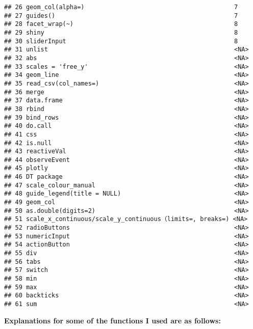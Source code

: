 \documentclass[
]{article}
\begin{document}
\begin{verbatim}
## 26 geom_col(alpha=)                                         7    
## 27 guides()                                                 7    
## 28 facet_wrap(~)                                            8    
## 29 shiny                                                    8    
## 30 sliderInput                                              8    
## 31 unlist                                                   <NA> 
## 32 abs                                                      <NA> 
## 33 scales = 'free_y'                                        <NA> 
## 34 geom_line                                                <NA> 
## 35 read_csv(col_names=)                                     <NA> 
## 36 merge                                                    <NA> 
## 37 data.frame                                               <NA> 
## 38 rbind                                                    <NA> 
## 39 bind_rows                                                <NA> 
## 40 do.call                                                  <NA> 
## 41 css                                                      <NA> 
## 42 is.null                                                  <NA> 
## 43 reactiveVal                                              <NA> 
## 44 observeEvent                                             <NA> 
## 45 plotly                                                   <NA> 
## 46 DT package                                               <NA> 
## 47 scale_colour_manual                                      <NA> 
## 48 guide_legend(title = NULL)                               <NA> 
## 49 geom_col                                                 <NA> 
## 50 as.double(digits=2)                                      <NA> 
## 51 scale_x_continuous/scale_y_continuous（limits=, breaks=) <NA> 
## 52 radioButtons                                             <NA> 
## 53 numericInput                                             <NA> 
## 54 actionButton                                             <NA> 
## 55 div                                                      <NA> 
## 56 tabs                                                     <NA> 
## 57 switch                                                   <NA> 
## 58 min                                                      <NA> 
## 59 max                                                      <NA> 
## 60 backticks                                                <NA> 
## 61 sum                                                      <NA>
\end{verbatim}

\textbf{Explanations for some of the functions I used are as follows:}
\end{document}
